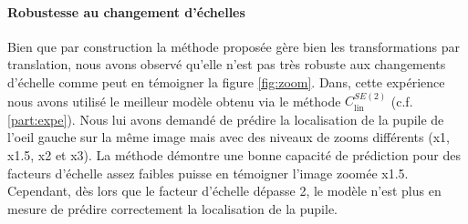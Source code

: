 \documentclass{article}
\begin{document}
\paragraph{Robustesse au changement d'échelles}\label{paragraph:robustness-to-scale}
Bien que par construction la méthode proposée gère bien les transformations par translation, nous 
avons observé qu'elle n'est pas très robuste aux changements d'échelle comme peut en témoigner la 
figure \ref{fig:zoom}. Dans, cette expérience nous avons utilisé le meilleur modèle obtenu via le méthode 
$C_{\text{lin}}^{SE(2)}$ (c.f. \ref{part:expe}). Nous lui avons demandé de prédire la localisation de la pupile de l'oeil 
gauche sur la même image mais avec des niveaux de zooms différents (x1, x1.5, x2 et x3). La méthode démontre 
une bonne capacité de prédiction pour des facteurs d'échelle assez faibles puisse en témoigner l'image zoomée 
x1.5. Cependant, dès lors que le facteur d'échelle dépasse 2, le modèle n'est plus en mesure de prédire correctement 
la localisation de la pupile.  
\end{document}
